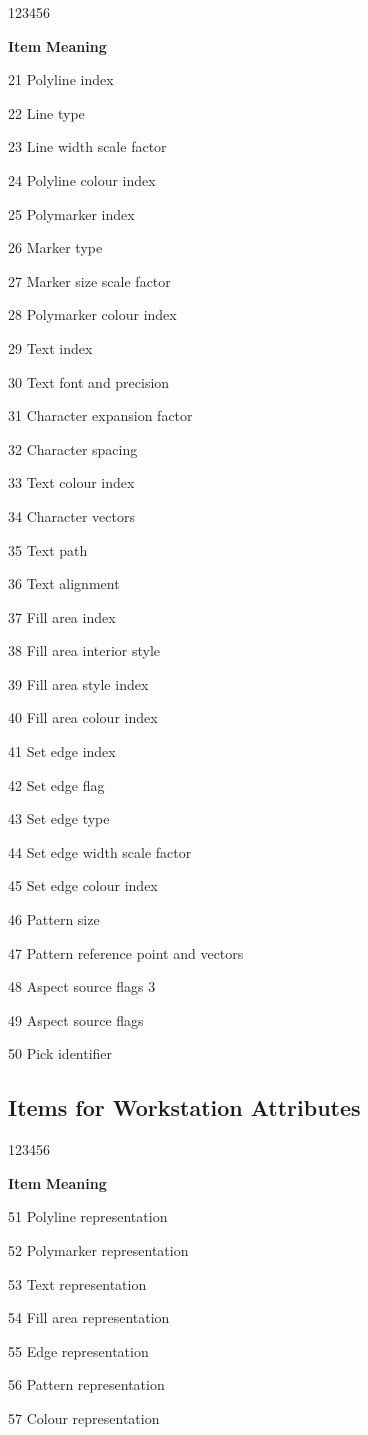 \begin{DLtt}{123456}
\item[{\rm\bf Item}] {\bf Meaning}
\item[21]Polyline index
\item[22]Line type
\item[23]Line width scale factor
\item[24]Polyline colour index
\item[25]Polymarker index
\item[26]Marker type
\item[27]Marker size scale factor
\item[28]Polymarker colour index
\item[29]Text index
\item[30]Text font and precision
\item[31]Character expansion factor
\item[32]Character spacing
\item[33]Text colour index
\item[34]Character vectors
\item[35]Text path
\item[36]Text alignment
\item[37]Fill area index
\item[38]Fill area interior style
\item[39]Fill area style index
\item[40]Fill area colour index
\item[41]Set edge index
\item[42]Set edge flag
\item[43]Set edge type
\item[44]Set edge width scale factor
\item[45]Set edge colour index
\item[46]Pattern size
\item[47]Pattern reference point and vectors
\item[48]Aspect source flags 3
\item[49]Aspect source flags
\item[50]Pick identifier
\end{DLtt}

\subsection*{Items for Workstation Attributes}

\begin{DLtt}{123456}
\item[{\rm\bf Item}] {\bf Meaning}
\item[51]Polyline representation
\item[52]Polymarker representation
\item[53]Text representation
\item[54]Fill area representation
\item[55]Edge representation
\item[56]Pattern representation
\item[57]Colour representation
\end{DLtt}

